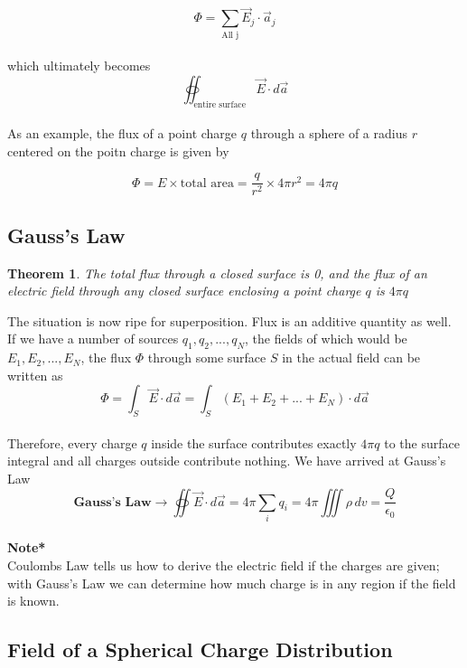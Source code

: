 \documentclass[svgnames]{article}
\newtheorem{theorem}{Theorem}		%
\begin{document}
\[ \Phi = \sum_{\text{All j}} \vec{E}_j \cdot \vec{a}_j \] \\

which ultimately becomes \\ 

\[ \oiint_\text{entire surface} \vec{E} \cdot d\vec{a} \] \\ 

As an example, the flux of a point charge $q$ through a sphere of a radius $r$ centered on the poitn charge is given by

\[ \Phi = E \times \text{total area} = \frac{q}{r^2} \times 4\pi r^2 = 4\pi q \] 

\subsection{Gauss's Law} 

\begin{theorem}
The total flux through a closed surface is 0, and the flux of an electric field through \textit{any} closed surface enclosing a point charge $q$ is $4\pi q$ 
\end{theorem} 

The situation is now ripe for superposition. Flux is an additive quantity as
well. If we have a number of sources $q_1,q_2,...,q_N$, the fields of which would be $E_1,E_2,...,E_N$, the flux $\Phi$ through some surface $S$ in the actual field can be written as \\

\[ \Phi = \int_S \vec{E} \cdot d\vec{a} = \int_S (E_1 + E_2 + ... + E_N) \cdot d\vec{a} \] \\

Therefore, every charge $q$ inside the surface contributes exactly $4\pi q$ to the surface integral and all charges outside contribute nothing. We have arrived at Gauss's Law \\ 

\[ \textbf{Gauss's Law} \rightarrow  \oiint \vec{E} \cdot d\vec{a} = 4\pi \sum_i q_i = 4\pi \iiint \rho \, dv =  \frac{Q}{\epsilon_0} \] \\ 


\textbf{Note*} \\

Coulombs Law tells us how to derive the electric field if the charges are given; with Gauss's Law we can determine how much charge is in any region if the field is known. 

\subsection{Field of a Spherical Charge Distribution} 
\end{document}

